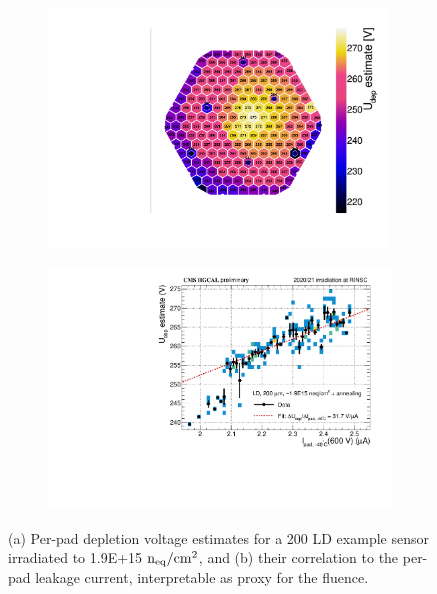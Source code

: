\begin{figure}
	\captionsetup[subfigure]{aboveskip=-1pt,belowskip=-1pt}
	\centering
	\begin{subfigure}[b]{0.49\textwidth}
		\centering
		\includegraphics[width=0.99\textwidth]{plots/Vdep_hexplots/0541_04.pdf}
		\subcaption{
			}
			\label{plot:Vdep_hexplot_0541_04}
	\end{subfigure}
	\hfill
	\begin{subfigure}[b]{0.49\textwidth}
		\centering
		\includegraphics[width=0.999\textwidth]{plots/Vdep_vs_fluence/Vdep_vs_current_5414.pdf}
		\subcaption{
			}
			\label{plot:Vdep_vs_current_5414}
	\end{subfigure}
	\caption{
		(a) Per-pad depletion voltage estimates for a \SI{200}{\micron} LD example sensor irradiated to 1.9E+15$~\mathrm{n_{eq}}/\mathrm{cm}^{2}$, and 
		(b) their correlation to the per-pad leakage current, interpretable as proxy for the fluence.
	}
\end{figure}
